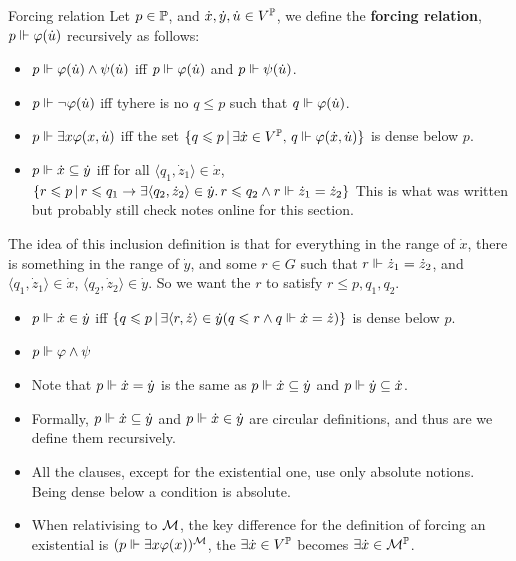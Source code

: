 \documentclass{article}
\begin{document}
    \begin{fancydefine}{Forcing relation}
        Let $p \in \mathbb{P}$, and $\dot{x},\dot{y},\dot{u} \in V^{\mathbb{P}}$, we define the \textbf{forcing relation}, $p \Vdash \varphi(\dot{u})$ recursively as follows: \begin{itemize}
            \item $p \Vdash \varphi(\dot{u}) \wedge \psi(\dot{u})$ iff $p \Vdash \varphi(\dot{u})$ and $p \Vdash \psi(\dot{u})$.
            \item $p \Vdash \neg \varphi(\dot{u})$ iff tyhere is no $q \leq p$ such that $q \Vdash \varphi(\dot{u})$.
            \item $p \Vdash \exists x \varphi(x, \dot{u})$ iff the set $\{q \leqslant p \, | \, \exists \dot{x} \in V^{\mathbb{P}}, \, q \Vdash \varphi(\dot{x},\dot{u})\}$ is dense below $p$.
            \item $p \Vdash \dot{x} \subseteq \dot{y}$ iff for all $\langle q_{1}, \dot{z}_{1} \rangle \in \dot{x}$, $\{r \leqslant p \, | \, r \leqslant q_{1} \rightarrow \exists \langle q_{2}, \dot{z}_{2} \rangle \in \dot{y}. \, r \leqslant q_{2} \wedge r \Vdash \dot{z}_{1}=\dot{z}_{2}\}$ This is what was written but probably still check notes online for this section.
        \end{itemize}
        The idea of this inclusion definition is that for everything in the range of $\dot{x}$, there is something in the range of $\dot{y}$, and some $r \in G$ such that $r \Vdash \dot{z}_{1} = \dot{z}_{2}$, and $\langle q_{1}, \dot{z}_{1} \rangle \in \dot{x}$, $\langle q_{2}, \dot{z}_{2} \rangle \in \dot{y}$. So we want the $r$ to satisfy $r \leq p, q_{1}, q_{2}$.
        \begin{itemize}
            \item $p \Vdash \dot{x} \in \dot{y}$ iff $ \{ q \leqslant p \, | \, \exists \langle r, \dot{z} \rangle \in \dot{y} (q \leqslant r \wedge q \Vdash \dot{x} = \dot{z})\}$ is dense below $p$.
            \item $p \Vdash \varphi \wedge \psi$
            \item Note that $p \Vdash \dot{x} = \dot{y}$ is the same as $p \Vdash \dot{x} \subseteq \dot{y}$ and $p \Vdash \dot{y} \subseteq \dot{x}$.
        \end{itemize}
    \end{fancydefine}
    \newlec
    \begin{remark*}\hspace{0.1cm}
        \begin{itemize}
            \item Formally, $p \Vdash \dot{x} \subseteq \dot{y}$ and $p \Vdash \dot{x} \in \dot{y}$ are circular definitions, and thus are we define them recursively.
            \item All the clauses, except for the existential one, use only absolute notions. Being dense below a condition is absolute.
            \item When relativising to $\mathcal{M}$, the key difference for the definition of forcing an existential is $(p \Vdash \exists x \varphi(x))^{\mathcal{M}}$, the $\exists \dot{x} \in V^{\mathbb{P}}$ becomes $\exists \dot{x} \in \mathcal{M}^{\mathbb{P}}$.
        \end{itemize}
    \end{remark*}
\end{document}
